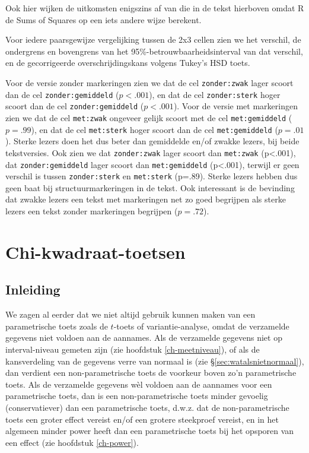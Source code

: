 \documentclass[
]{book}
\begin{document}
Ook hier wijken de uitkomsten enigszins af van die in de tekst hierboven omdat R de Sums of Squares op een iets andere wijze berekent.

Voor iedere paarsgewijze vergelijking tussen de 2x3 cellen zien we het verschil, de ondergrens en bovengrens van het 95\%-betrouwbaarheidsinterval van dat verschil, en de
gecorrigeerde overschrijdingskans volgens Tukey's HSD toets.

Voor de versie zonder markeringen zien we dat de cel \texttt{zonder:zwak} lager scoort dan de cel \texttt{zonder:gemiddeld} (\(p<.001\)), en dat de cel \texttt{zonder:sterk} hoger scoort dan de cel \texttt{zonder:gemiddeld} (\(p<.001\)).
Voor de versie met markeringen zien we dat de cel \texttt{met:zwak} ongeveer gelijk scoort met de cel \texttt{met:gemiddeld} (\(p=.99\)), en dat de cel \texttt{met:sterk} hoger scoort dan de cel \texttt{met:gemiddeld} (\(p=.01\)). Sterke lezers doen het dus beter dan gemiddelde en/of zwakke lezers, bij beide tekstversies.
Ook zien we dat \texttt{zonder:zwak} lager scoort dan \texttt{met:zwak} (p\textless.001), dat \texttt{zonder:gemiddeld} lager scoort dan \texttt{met:gemiddeld} (p\textless.001), terwijl er geen verschil is tussen \texttt{zonder:sterk} en \texttt{met:sterk} (p=.89). Sterke lezers hebben dus geen baat bij structuurmarkeringen in de tekst.
Ook interessant is de bevinding dat zwakke lezers een tekst met markeringen net zo goed begrijpen als sterke lezers een tekst zonder markeringen begrijpen (\(p=.72\)).

\chapter{Chi-kwadraat-toetsen}\label{ch-chi-kwadraat-toetsen}

\section{Inleiding}\label{sec:h16inleiding}

We zagen al eerder dat we niet altijd gebruik kunnen maken van een
parametrische toets zoals de \(t\)-toets of variantie-analyse, omdat de verzamelde
gegevens niet voldoen aan de aannames. Als de verzamelde gegevens niet
op interval-niveau gemeten zijn (zie hoofdstuk
\ref{ch-meetniveau}), of als de kansverdeling van de gegevens
verre van normaal is (zie
§\ref{sec:watalsnietnormaal}), dan verdient een non-parametrische
toets de voorkeur boven zo'n parametrische toets. Als de verzamelde
gegevens wèl voldoen aan de aannames voor een parametrische toets, dan
is een non-parametrische toets minder gevoelig (conservatiever) dan een
parametrische toets, d.w.z. dat de non-parametrische toets een groter
effect vereist en/of een grotere steekproef vereist, en in het algemeen
minder power heeft dan een parametrische toets bij het opsporen van een
effect (zie hoofdstuk \ref{ch-power}).
\end{document}
